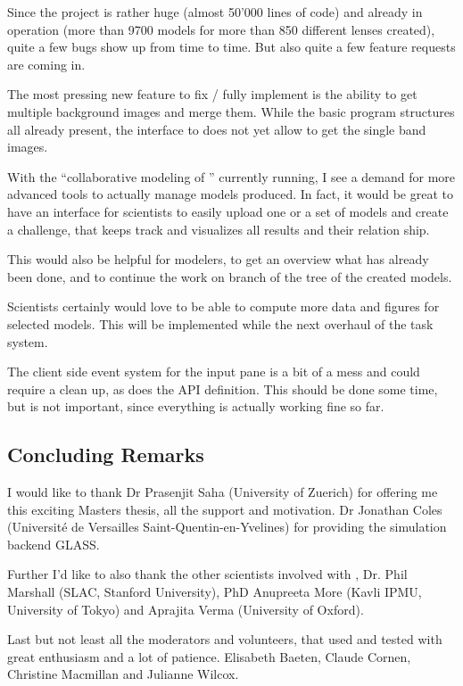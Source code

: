 Since the project is rather huge (almost 50'000 lines of code) and already in operation (more than 9700 models for more than 850 different lenses created), quite a few bugs show up from time to time.
But also quite a few feature requests are coming in.

The most pressing new feature to fix / fully implement is the ability to get multiple background images and merge them. While the basic program structures all already present, the interface to \sw does not yet allow to get the single band images.

With the ``collaborative modeling of '' currently running, I see a demand for more advanced tools to actually manage models produced. In fact, it would be great to have an interface for scientists to easily upload one or a set of models and create a challenge, that keeps track and visualizes all results and their relation ship.

This would also be helpful for modelers, to get an overview what has already been done, and to continue the work on branch of the tree of the created models.

Scientists certainly would love to be able to compute more data and figures for selected models.
This will be implemented while the next overhaul of the task system.

The client side event system for the input pane is a bit of a mess and could require a clean up, as does the API definition.
This should be done some time, but is not important, since everything is actually working fine so far.


\subsection{Concluding Remarks}

I would like to thank Dr Prasenjit Saha (University of Zuerich) for offering me this exciting Masters thesis, all the support and motivation. Dr Jonathan Coles (Université de Versailles Saint-Quentin-en-Yvelines) for providing the simulation backend GLASS.

Further I'd like to also thank the other scientists involved with \sw, Dr. Phil Marshall (SLAC, Stanford University), PhD Anupreeta More (Kavli IPMU, University of Tokyo) and Aprajita Verma (University of Oxford).

Last but not least all the \sw moderators and volunteers, that used and tested \spl with great enthusiasm and a lot of patience. Elisabeth Baeten, Claude Cornen, Christine Macmillan and Julianne Wilcox.